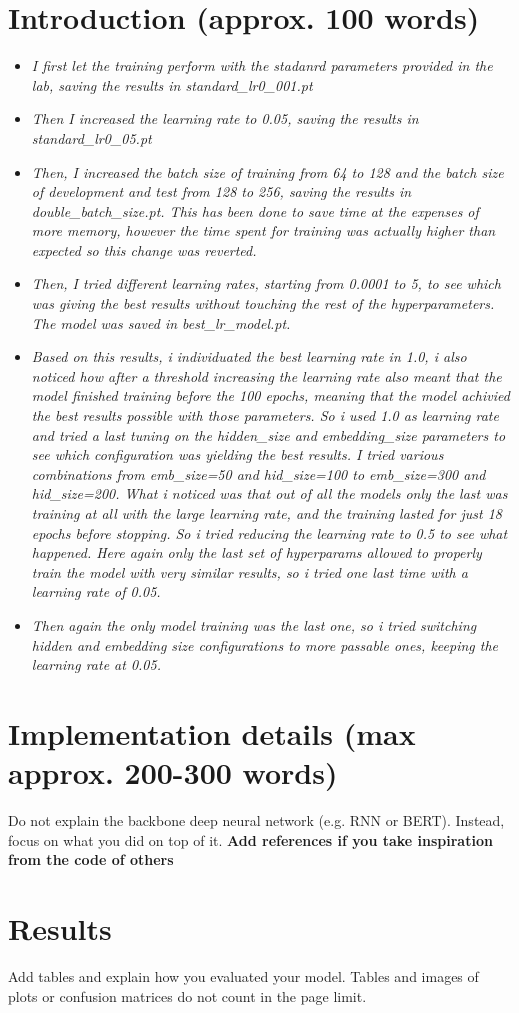 \documentclass[a4paper]{article}
\begin{document}
\section{Introduction (approx. 100 words)}
\begin{itemize}
    \item \textit{I first let the training perform with the stadanrd parameters provided in the lab, saving the results in standard_lr0_001.pt}
    \item \textit{Then I increased the learning rate to 0.05, saving the results in standard_lr0_05.pt}
    \item \textit{Then, I increased the batch size of training from 64 to 128 and the batch size of development and test from 128 to 256, saving the results in double_batch_size.pt. This has been done to save time at the expenses of more memory, however the time spent for training was actually higher than expected so this change was reverted.}
    \item \textit{Then, I tried different learning rates, starting from 0.0001 to 5, to see which was giving the best results without touching the rest of the hyperparameters. The model was saved in best_lr_model.pt.}
    \item \textit{Based on this results, i individuated the best learning rate in 1.0, i also noticed how after a threshold increasing the learning rate also meant that the model finished training before the 100 epochs, meaning that the model achivied the best results possible with those parameters. So i used 1.0 as learning rate and tried a last tuning on the hidden_size and embedding_size parameters to see which configuration was yielding the best results. I tried various combinations from emb_size=50 and hid_size=100 to emb_size=300 and hid_size=200. 
    What i noticed was that out of all the models only the last was training at all with the large learning rate, and the training lasted for just 18 epochs before stopping. So i tried reducing the learning rate to 0.5 to see what happened. Here again only the last set of hyperparams allowed to properly train the model with very similar results, so i tried one last time with a learning rate of 0.05.}
    \item \textit{Then again the only model training was the last one, so i tried switching hidden and embedding size configurations to more passable ones, keeping the learning rate at 0.05.}
\end{itemize}
\section{Implementation details (max approx. 200-300 words)}
Do not explain the backbone deep neural network (e.g. RNN or BERT). Instead, focus on what you did on top of it. \textbf{Add references if you take inspiration from the code of others}

\section{Results}
Add tables and explain how you evaluated your model. Tables and images of plots or confusion matrices do not count in the page limit.





\end{document}
